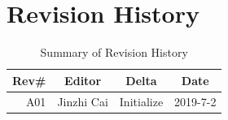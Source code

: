 \documentclass[12pt,article]{memoir}
\begin{document}
\chapter{Revision History}
\begin{table}[H]
	\centering
	\begin{tabu}{r || c | c | c }
		Rev\# & Editor & Delta & Date\\ \hline
		A01 & Jinzhi Cai & Initialize  & 2019-7-2\\ \hline
	\end{tabu}
	\caption{Summary of Revision History}
	\label{tab:edatools}
\end{table}
\end{document}
